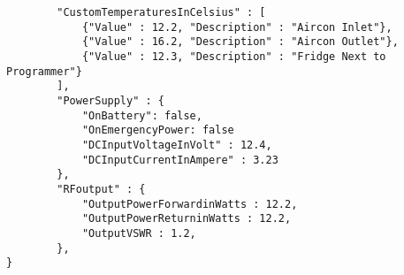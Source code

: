 \documentclass[a4paper]{article}
\begin{document}
\begin{lstlisting}
		"CustomTemperaturesInCelsius" : [
			{"Value" : 12.2, "Description" : "Aircon Inlet"},
			{"Value" : 16.2, "Description" : "Aircon Outlet"},
            {"Value" : 12.3, "Description" : "Fridge Next to Programmer"}
		],
		"PowerSupply" : {
			"OnBattery": false,
			"OnEmergencyPower: false
			"DCInputVoltageInVolt" : 12.4,
			"DCInputCurrentInAmpere" : 3.23
		},
		"RFoutput" : {
			"OutputPowerForwardinWatts : 12.2,
			"OutputPowerReturninWatts : 12.2,	
			"OutputVSWR : 1.2,
		},
}
\end{lstlisting}





%
%
%
%
%
%
\end{document}
